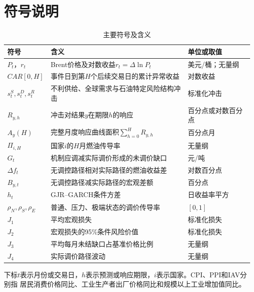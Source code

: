 \section{符号说明}

\begin{table}[htbp]
  \centering
  \small
  \caption{主要符号及含义}
  \label{tab:symbols}
  \begin{tabularx}{0.96\textwidth}{p{}Xp{}}
    \toprule
    符号 & 含义 & 单位或取值 \\
    \midrule
    $P_t$，$r_t$ & Brent价格及对数收益$r_t=\Delta\ln P_t$ & 美元/桶；无量纲 \\
    $CAR[0,H]$ & 事件日到第$H$个后续交易日的累计异常收益 & 对数收益 \\
    $s_t^S,s_t^D,s_t^R$ & 不利供给、全球需求与石油特定风险结构冲击 & 标准化冲击 \\
    $R_{y,h}$ & 冲击对结果$y$在期限$h$的响应 & 百分点或对数百分点 \\
    $A_y(H)$ & 完整月度响应曲线面积$\sum_{h=0}^{H}R_{y,h}$ & 百分点月 \\
    $\Pi_{i,H}$ & 国家$i$的$H$月燃油传导率 & 无量纲 \\
    $G_t$ & 机制应调减实际调价形成的未调价缺口 & 元/吨 \\
    $\Delta f_t$ & 无调控路径相对实际路径的燃油收益差 & 对数百分点 \\
    $B_{y,t}$ & 无调控路径减实际路径的宏观差额 & 百分点 \\
    $h_t$ & GJR--GARCH条件方差 & 日收益率平方 \\
    $\rho_N,\rho_S,\rho_E$ & 普通、压力、极端状态的调价传导率 & $[0,1]$ \\
    $J_1$ & 平均宏观损失 & 标准化损失 \\
    $J_2$ & 宏观损失的95\%条件风险价值 & 标准化损失 \\
    $J_3$ & 平均每月未结缺口占基准价格比例 & 无量纲 \\
    $J_4$ & 实际调价路径波动 & 无量纲 \\
    \bottomrule
  \end{tabularx}
\end{table}

下标$t$表示月份或交易日，$h$表示预测或响应期限，$i$表示国家。CPI、PPI和IAV分别指
居民消费价格同比、工业生产者出厂价格同比和规模以上工业增加值同比。
